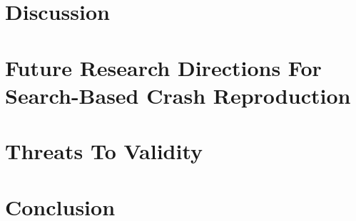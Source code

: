 \section{Discussion}
\label{sec:jcrashpack:discussion}


\section{Future Research Directions For Search-Based Crash Reproduction}
\label{sec:jcrashpack:futurework}


\section{Threats To Validity}
\label{sec:jcrashpack:threats}


\section{Conclusion}
\label{sec:jcrashpack:conclusion}
